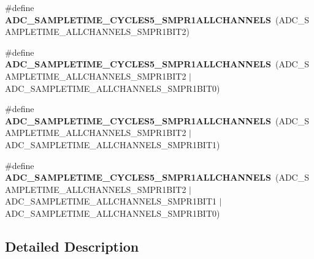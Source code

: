 \begin{DoxyCompactItemize}
\item 
\mbox{\label{group___a_d_c__sampling__times__all__channels_ga4e67a3f90595a06cd5b95ef1df6ade6e}} 
\#define {\bfseries A\+D\+C\+\_\+\+S\+A\+M\+P\+L\+E\+T\+I\+M\+E\+\_\+C\+Y\+C\+L\+E\+S5\+\_\+\+S\+M\+P\+R1\+A\+L\+L\+C\+H\+A\+N\+N\+E\+LS}~(A\+D\+C\+\_\+\+S\+A\+M\+P\+L\+E\+T\+I\+M\+E\+\_\+\+A\+L\+L\+C\+H\+A\+N\+N\+E\+L\+S\+\_\+\+S\+M\+P\+R1\+B\+I\+T2)
\item 
\mbox{\label{group___a_d_c__sampling__times__all__channels_gacc7326edc082928befeeb5ce02b3f2ab}} 
\#define {\bfseries A\+D\+C\+\_\+\+S\+A\+M\+P\+L\+E\+T\+I\+M\+E\+\_\+C\+Y\+C\+L\+E\+S5\+\_\+\+S\+M\+P\+R1\+A\+L\+L\+C\+H\+A\+N\+N\+E\+LS}~(A\+D\+C\+\_\+\+S\+A\+M\+P\+L\+E\+T\+I\+M\+E\+\_\+\+A\+L\+L\+C\+H\+A\+N\+N\+E\+L\+S\+\_\+\+S\+M\+P\+R1\+B\+I\+T2 $\vert$ A\+D\+C\+\_\+\+S\+A\+M\+P\+L\+E\+T\+I\+M\+E\+\_\+\+A\+L\+L\+C\+H\+A\+N\+N\+E\+L\+S\+\_\+\+S\+M\+P\+R1\+B\+I\+T0)
\item 
\mbox{\label{group___a_d_c__sampling__times__all__channels_gad286da3d7be2eab1c617b4c38ccfe02d}} 
\#define {\bfseries A\+D\+C\+\_\+\+S\+A\+M\+P\+L\+E\+T\+I\+M\+E\+\_\+C\+Y\+C\+L\+E\+S5\+\_\+\+S\+M\+P\+R1\+A\+L\+L\+C\+H\+A\+N\+N\+E\+LS}~(A\+D\+C\+\_\+\+S\+A\+M\+P\+L\+E\+T\+I\+M\+E\+\_\+\+A\+L\+L\+C\+H\+A\+N\+N\+E\+L\+S\+\_\+\+S\+M\+P\+R1\+B\+I\+T2 $\vert$ A\+D\+C\+\_\+\+S\+A\+M\+P\+L\+E\+T\+I\+M\+E\+\_\+\+A\+L\+L\+C\+H\+A\+N\+N\+E\+L\+S\+\_\+\+S\+M\+P\+R1\+B\+I\+T1)
\item 
\mbox{\label{group___a_d_c__sampling__times__all__channels_ga1f73f7f89435bc2d63db39ebe9f0d72a}} 
\#define {\bfseries A\+D\+C\+\_\+\+S\+A\+M\+P\+L\+E\+T\+I\+M\+E\+\_\+C\+Y\+C\+L\+E\+S5\+\_\+\+S\+M\+P\+R1\+A\+L\+L\+C\+H\+A\+N\+N\+E\+LS}~(A\+D\+C\+\_\+\+S\+A\+M\+P\+L\+E\+T\+I\+M\+E\+\_\+\+A\+L\+L\+C\+H\+A\+N\+N\+E\+L\+S\+\_\+\+S\+M\+P\+R1\+B\+I\+T2 $\vert$ A\+D\+C\+\_\+\+S\+A\+M\+P\+L\+E\+T\+I\+M\+E\+\_\+\+A\+L\+L\+C\+H\+A\+N\+N\+E\+L\+S\+\_\+\+S\+M\+P\+R1\+B\+I\+T1 $\vert$ A\+D\+C\+\_\+\+S\+A\+M\+P\+L\+E\+T\+I\+M\+E\+\_\+\+A\+L\+L\+C\+H\+A\+N\+N\+E\+L\+S\+\_\+\+S\+M\+P\+R1\+B\+I\+T0)
\end{DoxyCompactItemize}


\subsection{Detailed Description}



